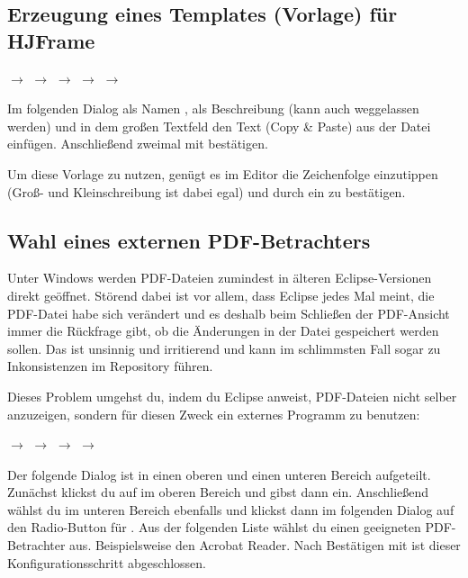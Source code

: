 \subsection{Erzeugung eines Templates (Vorlage) für HJFrame}

 $\rightarrow$  $\rightarrow$ 
$\rightarrow$  $\rightarrow$  $\rightarrow$

Im folgenden Dialog als Namen , als Beschreibung (kann
auch weggelassen werden)  und in dem großen Textfeld  den
Text (Copy \& Paste) aus der Datei  einfügen.
Anschließend zweimal mit  bestätigen.

Um diese Vorlage zu nutzen, genügt es im Editor die Zeichenfolge
 einzutippen (Groß- und Kleinschreibung ist dabei egal) und
durch ein  zu bestätigen.


\subsection{Wahl eines externen PDF-Betrachters}

Unter Windows werden PDF-Dateien zumindest in älteren Eclipse-Versionen direkt
geöffnet. Störend dabei ist vor allem, dass Eclipse jedes Mal meint, die
PDF-Datei habe sich verändert und es deshalb beim Schließen der PDF-Ansicht
immer die Rückfrage gibt, ob die Änderungen in der Datei gespeichert werden
sollen. Das ist unsinnig und irritierend und kann im schlimmsten Fall sogar zu
Inkonsistenzen im Repository führen.

Dieses Problem umgehst du, indem du Eclipse anweist, PDF-Dateien nicht selber
anzuzeigen, sondern für diesen Zweck ein externes Programm zu benutzen:

 $\rightarrow$  $\rightarrow$ 
$\rightarrow$  $\rightarrow$ 

Der folgende Dialog ist in einen oberen und einen unteren Bereich aufgeteilt.
Zunächst klickst du auf  im oberen Bereich und gibst dann
 ein. Anschließend wählst du im unteren Bereich ebenfalls
 und klickst dann im folgenden Dialog auf den Radio-Button für
. Aus der folgenden Liste wählst du einen geeigneten
PDF-Betrachter aus. Beispielsweise den Acrobat Reader. Nach Bestätigen mit
 ist dieser Konfigurationsschritt abgeschlossen.

